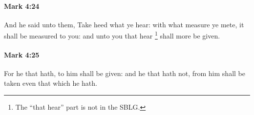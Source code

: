 		\paragraph{Mark 4:24} %
			\label{MARK-4-24}

			And he said unto them, Take heed what ye hear: with what measure ye mete, it shall be measured to you: and unto you that hear%
				\footnote{%
					The ``that hear'' part is not in the SBLG.
					}
			shall more be given.

			\begin{framed}
			\scriptsize
				\begin{compactdesc}
					\item[SBLG] 
				\end{compactdesc}
			\end{framed}

		\paragraph{Mark 4:25} %
			\label{MARK-4-25}

			For he that hath, to him shall be given: and he that hath not, from him shall be taken even that which he hath.

